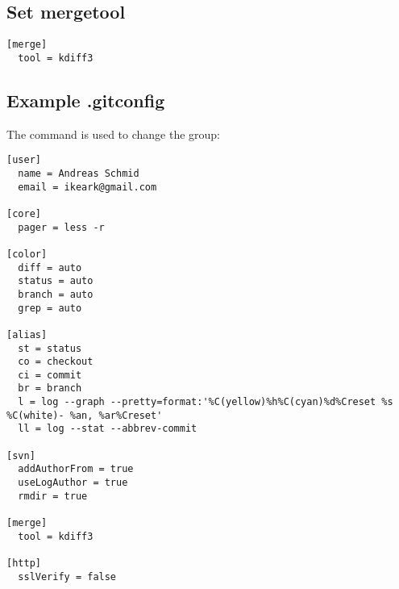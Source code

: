 \subsection{Set mergetool}
\begin{frame}[fragile]
  \subslidetitle
\begin{lstlisting}
[merge]
  tool = kdiff3
\end{lstlisting}
\end{frame}

\subsection{Example .gitconfig}
\begin{frame}[fragile]
  \subslidetitle
  The command  is used to change the group:


\begin{lstlisting}
[user]
  name = Andreas Schmid
  email = ikeark@gmail.com

[core]
  pager = less -r

[color]
  diff = auto
  status = auto
  branch = auto
  grep = auto

[alias]
  st = status
  co = checkout
  ci = commit
  br = branch
  l = log --graph --pretty=format:'%C(yellow)%h%C(cyan)%d%Creset %s %C(white)- %an, %ar%Creset'
  ll = log --stat --abbrev-commit

[svn]
  addAuthorFrom = true
  useLogAuthor = true
  rmdir = true

[merge]
  tool = kdiff3

[http]
  sslVerify = false
\end{lstlisting}
\end{frame}
